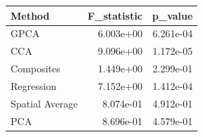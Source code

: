 \begin{tabular}{lrr}
\toprule
Method & F_statistic & p_value \\
\midrule
GPCA & 6.003e+00 & 6.261e-04 \\
CCA & 9.096e+00 & 1.172e-05 \\
Composites & 1.449e+00 & 2.299e-01 \\
Regression & 7.152e+00 & 1.412e-04 \\
Spatial Average & 8.074e-01 & 4.912e-01 \\
PCA & 8.696e-01 & 4.579e-01 \\
\bottomrule
\end{tabular}
